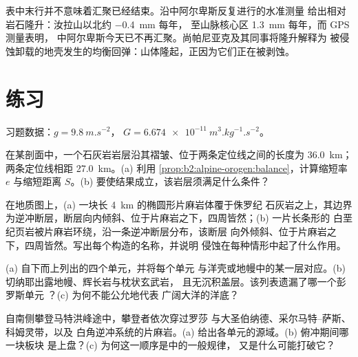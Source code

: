 表中末行并不意味着汇聚已经结束。沿中阿尔卑斯反复进行的水准测量
给出相对岩石隆升：汝拉山以北约 \qty{-0.4}{mm} 每年，
至山脉核心区 \qty{1.3}{mm} 每年，而 GPS 测量表明，
中阿尔卑斯今天已不再汇聚。尚帕尼亚克及其同事将隆升解释为
被侵蚀卸载的地壳发生的均衡回弹：山体隆起，正因为它们正在被剥蚀。

\section*{练习}\label{sec:b2:alpine-orogen:exercises}

习题数据：$g = \qty{9.8}{m.s^{-2}}$，
$G = \qty{6.674e-11}{m^3.kg^{-1}.s^{-2}}$。

\begin{exercise}[$\star$]\label{exo:b2:alpine-orogen:1}
在某剖面中，一个石灰岩岩层沿其褶皱、位于两条定位线之间的长度为
\qty{36.0}{km}；两条定位线相距 \qty{27.0}{km}。(a) 利用
\cref{prop:b2:alpine-orogen:balance}，计算缩短率 $e$ 与缩短距离
$S$。(b) 要使结果成立，该岩层须满足什么条件？
\end{exercise}

\begin{exercise}[$\star$]\label{exo:b2:alpine-orogen:2}
在地质图上，(a) 一块长 \qty{4}{km} 的椭圆形片麻岩体覆于侏罗纪
石灰岩之上，其边界为逆冲断层，断层向内倾斜、位于片麻岩之下，四周皆然；(b) 一片长条形的
白垩纪页岩被片麻岩环绕，沿一条逆冲断层分布，该断层
向外倾斜、位于片麻岩之下，四周皆然。写出每个构造的名称，并说明
侵蚀在每种情形中起了什么作用。
\end{exercise}

\begin{exercise}[$\star$]\label{exo:b2:alpine-orogen:3}
(a) 自下而上列出的四个单元，并将每个单元
与洋壳或地幔中的某一层对应。(b) 切纳耶出露地幔、辉长岩与枕状玄武岩，
且无沉积盖层。该列表遗漏了哪一个彭罗斯单元
？(c) 为何不能公允地代表
广阔大洋的洋底？
\end{exercise}

\begin{exercise}[$\star$]\label{exo:b2:alpine-orogen:4}
自南侧攀登马特洪峰途中，攀登者依次穿过罗莎
与大圣伯纳德、采尔马特–萨斯、科姆灵带，以及
白角逆冲系统的片麻岩。(a) 给出各单元的源域。(b) 俯冲期间哪一块板块
是上盘？(c) 为何这一顺序是中的一般规律，
又是什么可能打破它？
\end{exercise}

